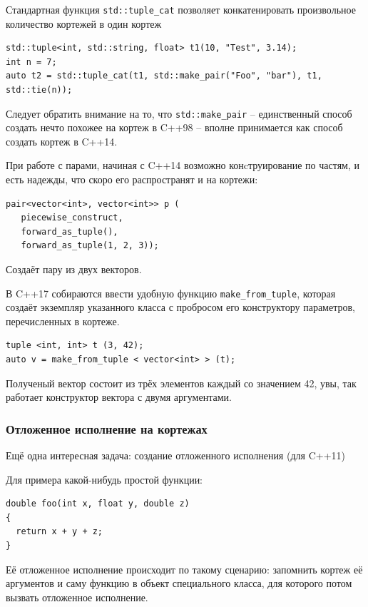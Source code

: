 \documentclass[a4paper,12pt,oneside]{article}
\begin{document}
Стандартная функция \lstinline!std::tuple_cat! позволяет конкатенировать произвольное количество кортежей в один кортеж

\begin{lstlisting}
std::tuple<int, std::string, float> t1(10, "Test", 3.14);
int n = 7;
auto t2 = std::tuple_cat(t1, std::make_pair("Foo", "bar"), t1, std::tie(n));
\end{lstlisting}

Следует обратить внимание на то, что \lstinline!std::make_pair! -- единственный способ создать нечто похожее на кортеж в C++98 -- вполне принимается как способ создать кортеж в C++14.

При работе с парами, начиная с C++14 возможно конcтруирование по частям, и есть надежды, что скоро его распространят и на кортежи:

\begin{lstlisting}
pair<vector<int>, vector<int>> p (
   piecewise_construct,
   forward_as_tuple(),
   forward_as_tuple(1, 2, 3));
\end{lstlisting}

Создаёт пару из двух векторов.

В C++17 собираются ввести удобную функцию \lstinline!make_from_tuple!, которая создаёт экземпляр указанного класса с пробросом его конструктору параметров, перечисленных в кортеже.

\begin{lstlisting}
tuple <int, int> t (3, 42);
auto v = make_from_tuple < vector<int> > (t);
\end{lstlisting}

Полученый вектор состоит из трёх элементов каждый со значением 42, увы, так работает конструктор вектора с двумя аргументами.

\subsubsection{Отложенное исполнение на кортежах}\label{DelayedExec}

Ещё одна интересная задача: создание отложенного исполнения (для C++11)

Для примера какой-нибудь простой функции:

\begin{lstlisting}
double foo(int x, float y, double z)
{
  return x + y + z;
}
\end{lstlisting}

Её отложенное исполнение происходит по такому сценарию: запомнить кортеж её аргументов и саму функцию в объект специального класса, для которого потом вызвать отложенное исполнение.
\end{document}
